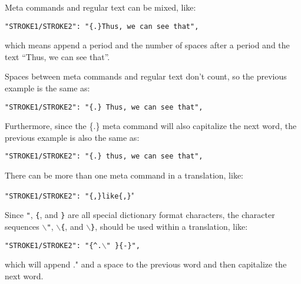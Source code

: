 \documentclass[11pt]{article}
\newcommand{\code}[1]{\texttt{#1}}
\newcommand{\meta}[1]{\{#1\}}
\begin{document}
Meta commands and regular text can be mixed, like:

\code{"STROKE1/STROKE2": "\meta{.}Thus, we can see that",}

which means append a period and the number of spaces after a period
and the text ``Thus, we can see that''.

Spaces between meta commands and regular text don't count, so the
previous example is the same as:

\code{"STROKE1/STROKE2": "\meta{.} Thus, we can see that",}

Furthermore, since the \meta{.} meta command will also capitalize the
next word, the previous example is also the same as:

\code{"STROKE1/STROKE2": "\meta{.} thus, we can see that",}

There can be more than one meta command in a translation, like:

\code{"STROKE1/STROKE2": "\meta{,}like\meta{,}}"

Since \code{"}, \code{\{}, and \code{\}} are all special dictionary
format characters, the character sequences \code{$\backslash$"},
\code{$\backslash$\{}, and \code{$\backslash$\}}, should be used
within a translation, like:

\code{"STROKE1/STROKE2": "\meta{\^{ }.$\backslash$"~}\meta{-\textbar}",}

which will append ." and a space to the previous word and then
capitalize the next word.
\end{document}
